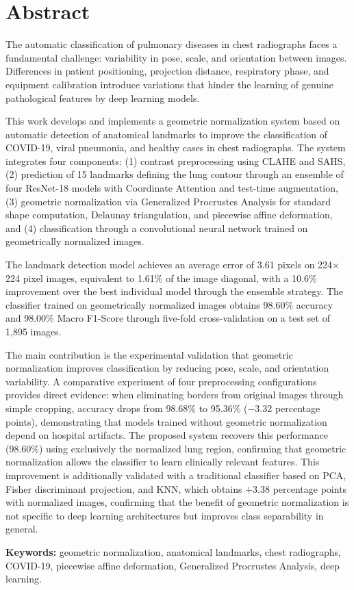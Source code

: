 
\section*{Abstract}

The automatic classification of pulmonary diseases in chest radiographs faces a fundamental challenge: variability in pose, scale, and orientation between images. Differences in patient positioning, projection distance, respiratory phase, and equipment calibration introduce variations that hinder the learning of genuine pathological features by deep learning models.

This work develops and implements a geometric normalization system based on automatic detection of anatomical landmarks to improve the classification of COVID-19, viral pneumonia, and healthy cases in chest radiographs. The system integrates four components: (1) contrast preprocessing using CLAHE and SAHS, (2) prediction of 15 landmarks defining the lung contour through an ensemble of four ResNet-18 models with Coordinate Attention and test-time augmentation, (3) geometric normalization via Generalized Procrustes Analysis for standard shape computation, Delaunay triangulation, and piecewise affine deformation, and (4) classification through a convolutional neural network trained on geometrically normalized images.

The landmark detection model achieves an average error of 3.61 pixels on 224$\times$224 pixel images, equivalent to 1.61\% of the image diagonal, with a 10.6\% improvement over the best individual model through the ensemble strategy. The classifier trained on geometrically normalized images obtains 98.60\% accuracy and 98.00\% Macro F1-Score through five-fold cross-validation on a test set of 1,895 images.

The main contribution is the experimental validation that geometric normalization improves classification by reducing pose, scale, and orientation variability. A comparative experiment of four preprocessing configurations provides direct evidence: when eliminating borders from original images through simple cropping, accuracy drops from 98.68\% to 95.36\% ($-$3.32 percentage points), demonstrating that models trained without geometric normalization depend on hospital artifacts. The proposed system recovers this performance (98.60\%) using exclusively the normalized lung region, confirming that geometric normalization allows the classifier to learn clinically relevant features. This improvement is additionally validated with a traditional classifier based on PCA, Fisher discriminant projection, and KNN, which obtains $+$3.38 percentage points with normalized images, confirming that the benefit of geometric normalization is not specific to deep learning architectures but improves class separability in general.

\textbf{Keywords:} geometric normalization, anatomical landmarks, chest radiographs, COVID-19, piecewise affine deformation, Generalized Procrustes Analysis, deep learning.

\vspace{1.5cm}

